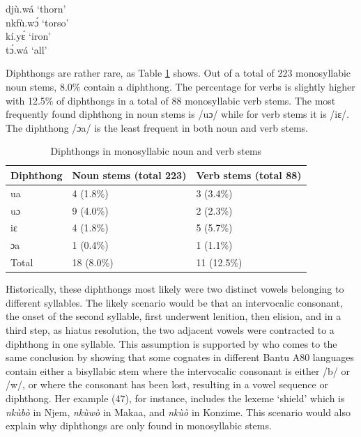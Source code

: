 \begin{exe} \ex \label{Hiat}
djù.wá `thorn'  \\
nkfù.wɔ́ `torso' \\
kí.yɛ́ `iron' \\
tɔ́.wá `all'
\end{exe}

Diphthongs are rather rare, as Table \ref{Tab:Diph} shows. Out of a total of 223 monosyllabic noun stems, 8.0\% contain a diphthong. The percentage for verbs is slightly higher with 12.5\% of diphthongs in a total of 88 monosyllabic verb stems. The most frequently found diphthong in noun stems is /uɔ/ while for verb stems it is /iɛ/. The diphthong /ɔa/ is the least frequent in both noun and verb stems.

\begin{table} 
\centering
\begin{tabular}{l|ll}
Diphthong & 	Noun stems (total 223) & Verb stems (total 88) \\  \midrule
ua		 & 	4 (1.8\%)	& 	3  (3.4\%)   \\
uɔ		& 	9 (4.0\%)	& 	2   (2.3\%)  \\
iɛ		& 	4 (1.8\%)	 & 	5  (5.7\%)   \\
ɔa	& 	1 (0.4\%)	& 	1   (1.1\%)  \\  \midrule
Total       &     18 (8.0\%)          &     11 (12.5\%)    \\
\end{tabular}
\caption{Diphthongs in monosyllabic noun and verb stems}
\label{Tab:Diph}
\end{table}

Historically, these diphthongs most likely were two distinct vowels belonging to different syllables. The likely scenario would be that an intervocalic consonant, the onset of the second syllable, first underwent lenition, then elision, and in a third step, as hiatus resolution, the two adjacent vowels were contracted to a diphthong in one syllable. This assumption is supported by \citet[330-331]{cheucle2014} who comes to the same conclusion by showing that some cognates in different Bantu A80 languages contain either a bisyllabic stem where the intervocalic consonant is either /b/ or /w/, or where the consonant has been lost, resulting in a vowel sequence or diphthong. Her example (47), for instance, includes the lexeme `shield' which is {\itshape nkùbò} in Njem, {\itshape nkùwò} in Makaa, and {\itshape nkùò} in Konzime.  This scenario would also explain why diphthongs are only found in monosyllabic stems. 

